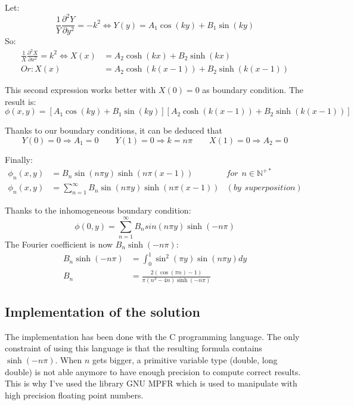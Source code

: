 \documentclass[a4paper,11pt]{article}
\begin{document}
\noindent Let: $$\frac{1}{Y}\frac{\partial^2 Y}{\partial y^2} = - k^2 \Leftrightarrow Y(y) = A_1\cos(k y) + B_1\sin(k y)$$ 
So:
\begin{align*}
  \frac{1}{X}\frac{\partial^2 X}{\partial x^2} = k^2 \Leftrightarrow X(x) & = A_2\cosh(k x) + B_2\sinh(k x) \\
  Or: X(x) & = A_2\cosh(k (x-1)) + B_2\sinh(k (x-1))
\end{align*}

\noindent This second expression works better with $X(0) = 0$ as boundary condition. The result is:
$$\phi(x,y) = [ A_1\cos(k y) + B_1\sin(k y)][A_2\cosh(k (x-1)) + B_2\sinh(k (x-1))]$$

\noindent Thanks to our boundary conditions, it can be deduced that
$$Y(0) = 0 \Rightarrow A_1=0 \hspace{2em} Y(1) = 0 \Rightarrow k=n \pi \hspace{2em} X(1) = 0 \Rightarrow A_2 = 0$$

\noindent Finally:
\begin{align*}
  \phi_n(x,y) & = B_n \sin(n \pi y)\sinh(n \pi (x-1)) & for\hspace{5pt}n \in \mathbb{N}^{+*} \\
  \phi_n(x,y) & = \sum_{n = 1}^{\infty}{B_n \sin(n \pi y)\sinh(n \pi (x-1))} & (by\hspace{5pt}superposition)
\end{align*}

\noindent Thanks to the inhomogeneous boundary condition:
\[
  \phi(0, y) = \sum_{n = 1}^{\infty}{B_n sin(n \pi y)\sinh(-n \pi)}
\]
The Fourier coefficient is now $B_n \sinh(-n \pi)$:
\begin{align*}
  B_n \sinh(-n \pi) & = \int_{0}^{1}{\sin^2(\pi y)\sin(n \pi y)dy} \\
  B_n & = \frac{2(\cos(\pi n) - 1)}{\pi(n^3 - 4n)\sinh(-n \pi)}
\end{align*}

\subsection{Implementation of the solution}
  The implementation has been done with the C programming language. The only constraint of using this language is
  that the resulting formula contains $\sinh(-n \pi)$. When $n$ gets bigger, a primitive variable type (double, long double)
  is not able anymore to have enough precision to compute correct results. This is why I've used the library
  GNU MPFR which is used to manipulate with high precision floating point numbers.
\end{document}
